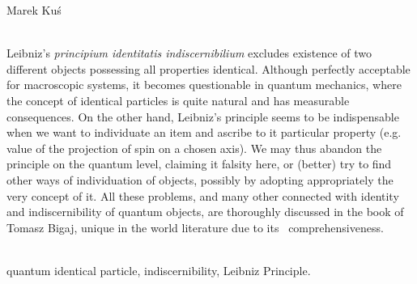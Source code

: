 \begin{newrevengenv}{Marek Kuś}



\vspace{15mm}%
{}\\
{Leibniz's \textit{principium identitatis indiscernibilium} excludes existence of two different objects possessing all properties identical. Although perfectly acceptable for macroscopic systems, it becomes questionable in quantum mechanics, where the concept of identical particles is quite natural and has measurable consequences. On the other hand, Leibniz’s principle seems to be indispensable when we want to individuate an item and ascribe to it particular property (e.g. value of the projection of spin on a chosen axis). We may thus abandon the principle on the quantum level, claiming it falsity here, or (better) try to find other ways of individuation of objects, possibly by adopting appropriately the very concept of it. All these problems, and many other connected with identity and indiscernibility of quantum objects, are thoroughly discussed in the book of Tomasz Bigaj, unique in the world literature due to its  comprehensiveness.}\par%
\vspace{2mm}%
{}\\
{quantum identical particle, indiscernibility, Leibniz Principle.}%



\end{newrevengenv}
